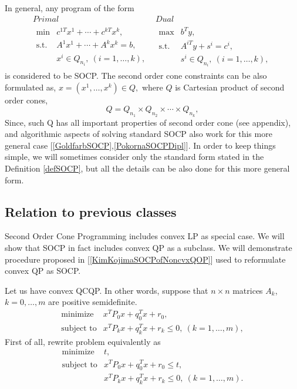 \documentclass[12pt]{book}
\theoremstyle{definition}
\begin{document}
\rem In general, any program of the form 
\begin{equation}
\begin{array}{cc}
Primal & Dual \\
\begin{array}{ll}
\mbox{min} &  c^{1T}x^1+\cdots + c^{kT}x^k,\\
\mbox{s.t.}& A^1x^1+ \cdots + A^kx^k = b, \\
& x^i \in Q_{n_i}, \ (i = 1,\dots ,k),
\end{array} 
 & 
 \begin{array}{ll}
\mbox{max} & b^Ty,\\
\mbox{s.t.}& A^{iT}y + s^i = c^i, \\ %
& s^i \in Q_{n_i}, \ (i = 1,\dots ,k),
\end{array}
\end{array}
\label{genSOCP}
\end{equation}
is considered to be SOCP.
The second order cone constraints can be also formulated as, $x = (x^1,\dots ,x^k) \in Q,$ where $Q$ is Cartesian product of second order cones, 
\begin{equation}
Q = Q_{n_1}\times Q_{n_2}\times \cdots \times Q_{n_k},
\end{equation}
 Since, such Q has all important properties of second order cone (see appendix), 
and algorithmic aspects of solving standard SOCP also work for this more general case [\ref{GoldfarbSOCP},\ref{PokornaSOCPDipl}].
In order to keep things simple, we will sometimes consider only the standard form stated in the Definition \ref{defSOCP},
but all the details can be also done for this more general form.


\subsection{Relation to previous classes}
\label{SectionRelBtwSOCPandQCQP}

Second Order Cone Programming includes convex LP as special case.
We will show that SOCP in fact includes convex QP as a subclass. We will demonstrate procedure proposed in [\ref{KimKojimaSOCPofNoncvxQOP}] used to reformulate convex QP as SOCP.

Let us have convex QCQP. In other words, suppose that $n\times n$ matrices $A_k$, $k=0,\dots ,m$ are positive semidefinite. 
\begin{equation}
\begin{array}{ll}
\mbox{minimize}& x^TP_0x + q_0^Tx + r_0, \\
\mbox{subject to}& x^TP_kx + q_k^Tx + r_k \leq 0, \  (k = 1,\dots ,m),
\end{array} 
\end{equation}
First of all, rewrite problem equivalently as
\begin{equation}
\begin{array}{ll}
\mbox{minimize}& t, \\
\mbox{subject to} & x^TP_0x + q_0^Tx + r_0 \leq t,\\
& x^TP_kx + q_k^Tx + r_k \leq 0, \  (k = 1,\dots ,m).
\end{array} 
\end{equation}
\end{document}
